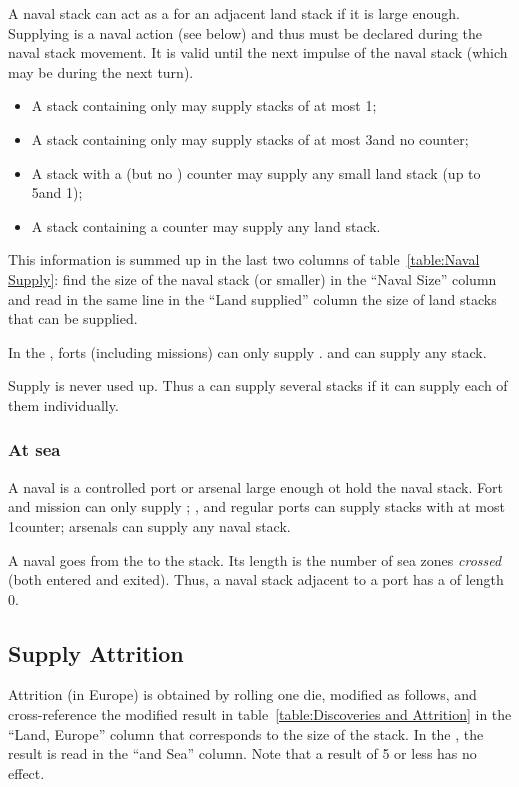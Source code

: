 A naval stack can act as a \SoS for an adjacent land stack if it is large
enough. Supplying is a naval action (see below) and thus must be declared
during the naval stack movement. It is valid until the next impulse of the
naval stack (which may be during the next turn).
\begin{itemize}
\item A stack containing only \NDE may supply stacks of at most 1\LD;
\item A stack containing only \ND may supply stacks of at most 3\LD and no
  \ARMY counter;
\item A stack with a \FLEET\facemoins (but no \FLEET\faceplus) counter may
  supply any small land stack (up to 5\LD and 1\Pasha);
\item A stack containing a \FLEET\faceplus counter may supply any land stack.
\end{itemize}
This information is summed up in the last two columns of
table~\ref{table:Naval Supply}: find the size of the naval stack (or smaller)
in the ``Naval Size'' column and read in the same line in the ``Land
supplied'' column the size of land stacks that can be supplied.


In the \ROTW, forts (including missions) can only supply \LD. \TP and \COL can
supply any stack.

Supply is never used up. Thus a \SoS can supply several stacks if it can
supply each of them individually.

\subsubsection{At sea}
A naval \SoS is a controlled port or arsenal large enough ot hold the naval
stack. Fort and mission can only supply \ND; \TP, \COL and regular ports can
supply stacks with at most 1\FLEET counter; arsenals can supply any naval
stack.

A naval \LoS goes from the \SoS to the stack. Its length is the number of sea
zones \emph{crossed} (both entered and exited). Thus, a naval stack adjacent
to a port has a \LoS of length 0.

\subsection{Supply Attrition}
Attrition (in Europe) is obtained by rolling one die, modified as follows, and
cross-reference the modified result in table~\ref{table:Discoveries and
  Attrition} in the ``Land, Europe'' column that corresponds to the size of
the stack. In the \ROTW, the result is read in the ``\ROTW and Sea''
column. Note that a result of 5 or less has no effect.


